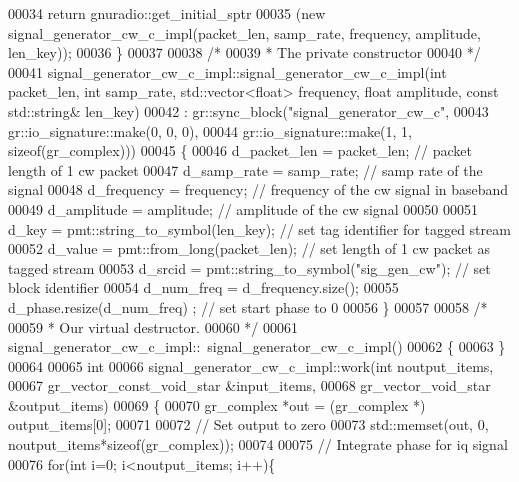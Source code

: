 \begin{DoxyCode}
00034       \textcolor{keywordflow}{return} gnuradio::get\_initial\_sptr
00035         (\textcolor{keyword}{new} signal_generator_cw_c_impl(packet\_len, samp\_rate, frequency, amplitude, len\_key));
00036     \}
00037 
00038     \textcolor{comment}{/*}
00039 \textcolor{comment}{     * The private constructor}
00040 \textcolor{comment}{     */}
00041     signal_generator_cw_c_impl::signal_generator_cw_c_impl(\textcolor{keywordtype}{int} packet\_len, \textcolor{keywordtype}{int} 
      samp_rate, std::vector<float> frequency, \textcolor{keywordtype}{float} amplitude, \textcolor{keyword}{const} std::string& len\_key)
00042       : gr::sync\_block(\textcolor{stringliteral}{"signal\_generator\_cw\_c"},
00043               gr::io\_signature::make(0, 0, 0),
00044               gr::io\_signature::make(1, 1, sizeof(gr\_complex)))
00045     \{
00046         d_packet_len = packet\_len; \textcolor{comment}{// packet length of 1 cw packet}
00047         d_samp_rate = samp_rate; \textcolor{comment}{// samp rate of the signal}
00048         d_frequency = frequency; \textcolor{comment}{// frequency of the cw signal in baseband}
00049         d_amplitude = amplitude; \textcolor{comment}{// amplitude of the cw signal}
00050         
00051         d_key = pmt::string\_to\_symbol(len\_key); \textcolor{comment}{// set tag identifier for tagged stream}
00052         d_value = pmt::from\_long(packet\_len); \textcolor{comment}{// set length of 1 cw packet as tagged stream}
00053         d_srcid = pmt::string\_to\_symbol(\textcolor{stringliteral}{"sig\_gen\_cw"}); \textcolor{comment}{// set block identifier}
00054         d_num_freq = d_frequency.size();
00055         d_phase.resize(d_num_freq) ; \textcolor{comment}{// set start phase to 0}
00056     \}
00057 
00058     \textcolor{comment}{/*}
00059 \textcolor{comment}{     * Our virtual destructor.}
00060 \textcolor{comment}{     */}
00061     signal_generator_cw_c_impl::~signal_generator_cw_c_impl()
00062     \{
00063     \}
00064 
00065     \textcolor{keywordtype}{int}
00066     signal_generator_cw_c_impl::work(\textcolor{keywordtype}{int} noutput\_items,
00067               gr\_vector\_const\_void\_star &input\_items,
00068               gr\_vector\_void\_star &output\_items)
00069     \{
00070         gr\_complex *out = (gr\_complex *) output\_items[0];
00071         
00072         \textcolor{comment}{// Set output to zero}
00073         std::memset(out, 0, noutput\_items*\textcolor{keyword}{sizeof}(gr\_complex));
00074         
00075         \textcolor{comment}{// Integrate phase for iq signal}
00076         \textcolor{keywordflow}{for}(\textcolor{keywordtype}{int} i=0; i<noutput\_items; i++)\{

\end{DoxyCode}
